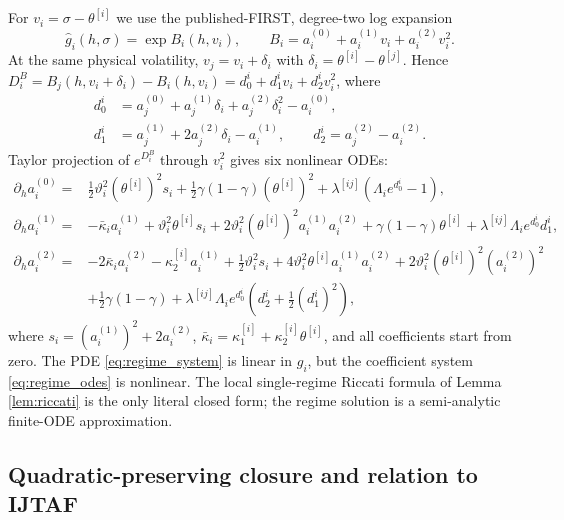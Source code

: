 \documentclass[11pt]{article}
\theoremstyle{remark}
\begin{document}
For $v_i=\sigma-\theta^{[i]}$ we use the published-FIRST, degree-two log expansion
\begin{equation}\label{eq:regime_ansatz}
\widehat g_i(h,\sigma)=\exp B_i(h,v_i),\qquad
B_i=a_i^{(0)}+a_i^{(1)}v_i+a_i^{(2)}v_i^2.
\end{equation}
At the same physical volatility, $v_j=v_i+\delta_i$ with
$\delta_i=\theta^{[i]}-\theta^{[j]}$.  Hence
$D_i^B=B_j(h,v_i+\delta_i)-B_i(h,v_i)=d_0^i+d_1^iv_i+d_2^iv_i^2$, where
\begin{equation}\label{eq:regime_dcoef}
\begin{split}
d_0^i&=a_j^{(0)}+a_j^{(1)}\delta_i+a_j^{(2)}\delta_i^2-a_i^{(0)},\\
d_1^i&=a_j^{(1)}+2a_j^{(2)}\delta_i-a_i^{(1)},\qquad
d_2^i=a_j^{(2)}-a_i^{(2)}.
\end{split}
\end{equation}
Taylor projection of $e^{D_i^B}$ through $v_i^2$ gives six nonlinear ODEs:
\begin{equation}\label{eq:regime_odes}
\begin{split}
\partial_h a_i^{(0)}={}&\frac12\vartheta_i^2(\theta^{[i]})^2s_i
+\frac12\gamma(1-\gamma)(\theta^{[i]})^2
+\lambda^{[ij]}\left(\Lambda_i e^{d_0^i}-1\right),\\
\partial_h a_i^{(1)}={}&-\bar\kappa_i a_i^{(1)}
+\vartheta_i^2\theta^{[i]}s_i
+2\vartheta_i^2(\theta^{[i]})^2a_i^{(1)}a_i^{(2)}
+\gamma(1-\gamma)\theta^{[i]}
+\lambda^{[ij]}\Lambda_i e^{d_0^i}d_1^i,\\
\partial_h a_i^{(2)}={}&-2\bar\kappa_i a_i^{(2)}-\kappa_2^{[i]}a_i^{(1)}
+\frac12\vartheta_i^2s_i
+4\vartheta_i^2\theta^{[i]}a_i^{(1)}a_i^{(2)}
+2\vartheta_i^2(\theta^{[i]})^2(a_i^{(2)})^2\\
&+\frac12\gamma(1-\gamma)
+\lambda^{[ij]}\Lambda_i e^{d_0^i}
\left(d_2^i+\frac12(d_1^i)^2\right),
\end{split}
\end{equation}
where $s_i=(a_i^{(1)})^2+2a_i^{(2)}$,
$\bar\kappa_i=\kappa_1^{[i]}+\kappa_2^{[i]}\theta^{[i]}$, and all coefficients
start from zero.  The PDE \eqref{eq:regime_system} is linear in $g_i$, but the
coefficient system \eqref{eq:regime_odes} is nonlinear.  The local single-regime
Riccati formula of Lemma \ref{lem:riccati} is the only literal closed form; the
regime solution is a semi-analytic finite-ODE approximation.

\subsection{Quadratic-preserving closure and relation to IJTAF}
\end{document}
